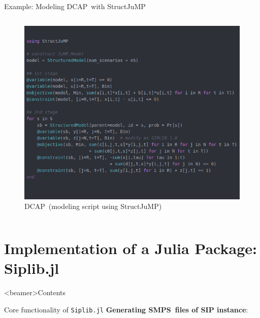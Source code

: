 \documentclass[usenames,dvipsnames]{beamer}
\newcommand{\smps}{\textsf{SMPS}}
\newcommand{\structjump}{\textsf{StructJuMP}}
\newcommand{\dcap}{\textsf{DCAP}}
\newcommand{\siplibjl}{\texttt{Siplib.jl}}
\begin{document}
\begin{frame}[shrink=40]{Example: Modeling \dcap\ with \structjump}
\begin{columns}
	\begin{column}{10cm}
		\vspace{1cm}
		\begin{figure}
			\centering
			\includegraphics[width=\textwidth,keepaspectratio]{dcap_structjump}
			\vspace{0.3cm}
			\caption{\dcap\ (modeling script using \structjump)}
		\end{figure}
	\end{column}
\end{columns}
\end{frame}



\section{Implementation of a Julia Package: Siplib.jl}
\begin{frame}<beamer>{Contents}
\end{frame}	

\begin{frame}{Core functionality of \siplibjl}
\textbf{Generating \smps\ files of SIP instance}:
\pause
\begin{figure}
\begin{center}
\end{center}
\end{figure}	
\end{frame}
\end{document}
